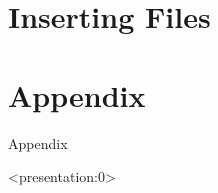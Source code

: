 \documentclass[12pt, aspectratio=169, xcolor=dvipsnames]{beamer}  %
\begin{document}
\section{Inserting Files}

%

\section{Appendix}

\begin{frame}
	\begin{center}
		\huge \textcolor{yaleblue}{Appendix}
	\end{center}
\end{frame}

\begin{frame}<presentation:0>
	 
	
\end{frame}
\end{document}

